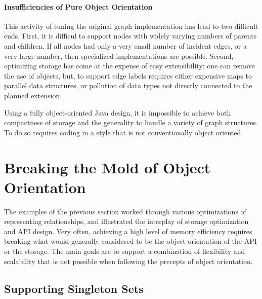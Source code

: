 \paragraph{Insufficiencies of Pure Object Orientation}
This activity of tuning the original graph implementation has lead to two
difficult ends. First, it is difficul to support nodes with widely
varying numbers of parents and children. If all nodes had only a very small number of incident
edges, or a very large number, then specialized implementations are possible.
Second, optimizing storage has come at the expense of easy extensibility; one
can remove the use of  objects, but, to support edge labels 
requires either expensive maps to parallel data structures, or 
pollution of data types not directly connected to the planned extension.

Using a fully object-oriented Java design, it is impossible to achieve both
compactness of storage and the generality to handle a variety of graph
structures. To do so requires coding in a style that is not conventionally object
oriented.







\section{Breaking the Mold of Object Orientation}
\label{sec:fortran-style}

The examples of the previous section worked through various optimizations of
representing relationships, and illustrated the interplay of storage optimization
and API design. Very often, achieving a high level of memory efficiency requires
breaking what would generally considered to be the object orientation of the API
or the storage. The main goals are to support a combination of flexibility and
scalability that is not possible when following the precepts of object
orientation.

\subsection{Supporting Singleton Sets}


